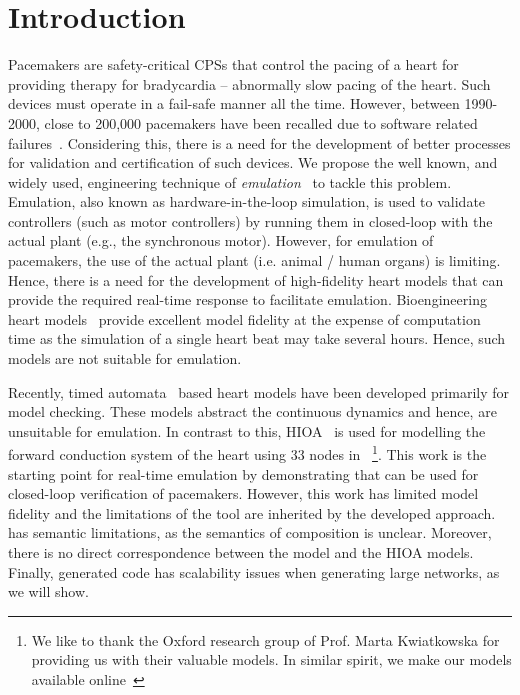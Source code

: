 \section{Introduction}

Pacemakers are safety-critical \acp{CPS} that control the pacing of a
heart for providing therapy for bradycardia -- abnormally slow pacing of
the heart. Such devices must operate in a fail-safe manner all the
time. However, between 1990-2000, close to 200,000 pacemakers have been
recalled due to software related
failures~\cite{alemzadeh13}. Considering this, there is a need for the
development of better processes for validation and certification of such
devices. We propose the well known, and widely used, engineering
technique of \emph{emulation}~\cite{patel2015survey} to tackle this
problem. Emulation, also known as hardware-in-the-loop simulation, is
used to validate controllers (such as motor controllers) by running them
in closed-loop with the actual plant (e.g., the synchronous motor).
However, for emulation of pacemakers, the use of the actual plant
(i.e. animal / human organs) is limiting. Hence, there is a need for the
development of high-fidelity heart models that can provide the required
real-time response to facilitate emulation. Bioengineering heart
models~\cite{Trayanova2014} provide excellent model fidelity at the
expense of computation time as the simulation of a single heart beat may
take several hours. Hence, such models are not suitable for emulation.

Recently, timed automata~\cite{zhihao12} based heart models have been
developed primarily for model checking. These models abstract the
continuous dynamics and hence, are unsuitable for emulation. In contrast
to this, \acf{HIOA}~\cite{alur2015book, raskin05} is used for modelling
the forward conduction system of the heart using 33 nodes
in~\cite{chen14} \footnote{We like to thank the Oxford research group of Prof. 
	Marta Kwiatkowska for providing us with their valuable  \simulink models.
	In similar spirit, we make our models available online~\cite{DATEBenchmarks}}. 
This work is the starting point for real-time
emulation by demonstrating that \simulink can be used for closed-loop
verification of pacemakers. However, this work has limited model
fidelity and the limitations of the tool \simulink are inherited by the
developed approach. \simulink has semantic limitations, as the semantics
of composition is unclear. Moreover, there is no
direct correspondence between the \simulink model and the \ac{HIOA}
models. Finally, \simulink generated code has scalability issues when 
generating large networks, as we will show.

